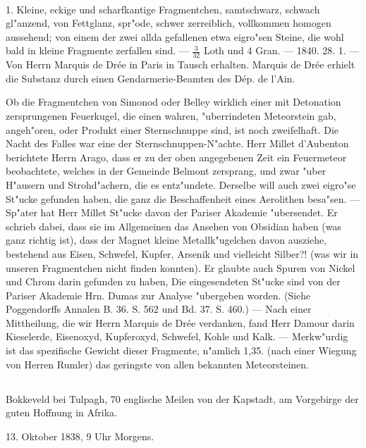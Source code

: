 \documentclass[a4paper, 11pt, oneside, polutonikogreek, german]{article}
\begin{document}
\paragraph{}
1. Kleine, eckige und scharfkantige Fragmentchen, samtschwarz, schwach gl"anzend, von Fettglanz, spr"ode, schwer zerreiblich, vollkommen homogen aussehend; von einem der zwei allda gefallenen etwa eigro"sen Steine, die wohl bald in kleine Fragmente zerfallen sind. --- $\frac{3}{32}$ Loth und 4 Gran. --- 1840. 28. 1. --- Von Herrn Marquis de Drée in Paris in Tausch erhalten. Marquis de Drée erhielt die Substanz durch einen Gendarmerie-Beamten des Dép. de l'Ain.

\setlength{\leftskip}{10mm}
\setlength{\parindent}{0pt}

{\footnotesize Ob die Fragmentchen von Simonod oder Belley wirklich einer mit Detonation zersprungenen Feuerkugel, die einen wahren, "uberrindeten Meteorstein gab, angeh"oren, oder Produkt einer Sternschnuppe sind, ist noch zweifelhaft. Die Nacht des Falles war eine der Sternschnuppen-N"achte. Herr Millet d’Aubenton berichtete Herrn Arago, dass er zu der oben angegebenen Zeit ein Feuermeteor beobachtete, welches in der Gemeinde Belmont zersprang, und zwar "uber H"ausern und Strohd"achern, die es entz"undete. Derselbe will auch zwei eigro"se St"ucke gefunden haben, die ganz die Beschaffenheit eines Aerolithen besa"sen. --- Sp"ater hat Herr Millet St"ucke davon der Pariser Akademie "ubersendet. Er schrieb dabei, dass sie im Allgemeinen das Ansehen von Obsidian haben (was ganz richtig ist), dass der Magnet kleine Metallk"ugelchen davon ausziehe, bestehend aus Eisen, Schwefel, Kupfer, Arsenik und vielleicht Silber?! (was wir in unseren Fragmentchen nicht finden konnten). Er glaubte auch Spuren von Nickel und Chrom darin gefunden zu haben, Die eingesendeten St"ucke sind von der Pariser Akademie Hrn. Dumas zur Analyse "ubergeben worden. (Siehe Poggendorffs Annalen B. 36. S. 562 und Bd. 37. S. 460.) --- Nach einer Mittheilung, die wir Herrn Marquis de Drée verdanken, fand Herr Damour darin Kieselerde, Eisenoxyd, Kupferoxyd, Schwefel, Kohle und Kalk. --- Merkw"urdig ist das spezifische Gewicht dieser Fragmente‚ n"amlich 1,35. (nach einer Wiegung von Herren Rumler) das geringste von allen bekannten Meteorsteinen.}

\setlength{\leftskip}{0pt}
\setlength{\parindent}{20pt}
\subsection{}
\begin{center}
Bokkeveld bei Tulpagh, 70 englische Meilen von der Kapstadt, am Vorgebirge der guten Hoffnung in Afrika.

13. Oktober 1838, 9 Uhr Morgens.
\end{center}
\end{document}
